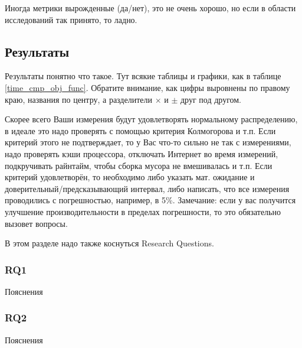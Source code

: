 Иногда метрики вырожденные (да/нет), это не очень хорошо, но если в области исследований так принято, то ладно.

\subsection{Результаты}
Результаты понятно что такое. Тут всякие таблицы и графики, как в таблице \ref{time_cmp_obj_func}. Обратите внимание, как цифры выровнены по правому краю, названия по центру, а разделители $\times$ и $\pm$ друг под другом. 

Скорее всего Ваши измерения будут удовлетворять нормальному распределению, в идеале это надо проверять с помощью критерия Колмогорова и т.п. Если критерий этого не подтверждает, то у Вас что-то сильно не так с измерениями, надо проверять кэши процессора, отключать Интернет во время измерений, подкручивать райнтайм, чтобы сборка мусора не вмешивалась и т.п. Если критерий удовлетворён, то необходимо либо указать мат. ожидание и доверительный/предсказывающий интервал, либо написать, что все измерения проводились с погрешностью, например, в 5\%. Замечание: если у вас получится улучшение производительности в пределах погрешности, то это обязательно вызовет вопросы.

В этом разделе надо также коснуться Research Questions.

\subsubsection{RQ1} Пояснения
\subsubsection{RQ2} Пояснения

